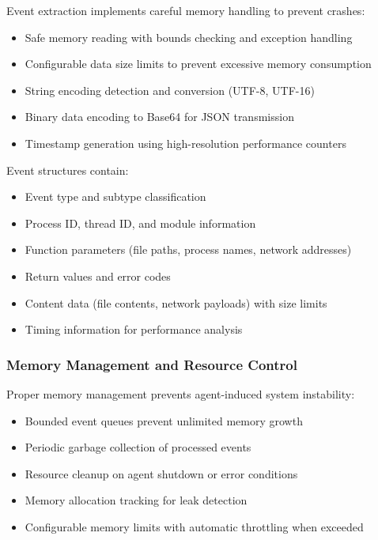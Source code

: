 Event extraction implements careful memory handling to prevent crashes:

\begin{itemize}
    \item Safe memory reading with bounds checking and exception handling
    \item Configurable data size limits to prevent excessive memory consumption
    \item String encoding detection and conversion (UTF-8, UTF-16)
    \item Binary data encoding to Base64 for JSON transmission
    \item Timestamp generation using high-resolution performance counters
\end{itemize}

Event structures contain:
\begin{itemize}
    \item Event type and subtype classification
    \item Process ID, thread ID, and module information
    \item Function parameters (file paths, process names, network addresses)
    \item Return values and error codes
    \item Content data (file contents, network payloads) with size limits
    \item Timing information for performance analysis
\end{itemize}

\subsubsection{Memory Management and Resource Control}

Proper memory management prevents agent-induced system instability:

\begin{itemize}
    \item Bounded event queues prevent unlimited memory growth
    \item Periodic garbage collection of processed events
    \item Resource cleanup on agent shutdown or error conditions
    \item Memory allocation tracking for leak detection
    \item Configurable memory limits with automatic throttling when exceeded
\end{itemize}

